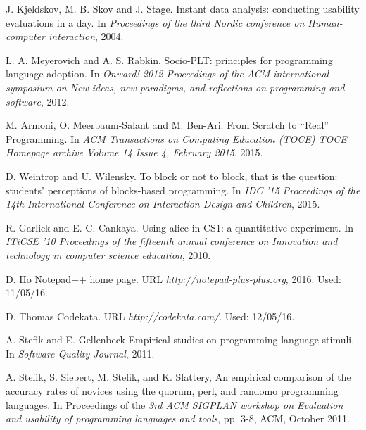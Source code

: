 \documentclass[preprint,10pt]{sigplanconf}
\begin{document}
\begin{thebibliography}{}
J. Kjeldskov, M. B. Skov and J. Stage. \newblock Instant data analysis: conducting usability evaluations in a day. \newblock In \emph{Proceedings of the third Nordic conference on Human-computer interaction}, 2004.

L. A. Meyerovich and A. S. Rabkin. \newblock Socio-PLT: principles for programming language adoption. \newblock In \emph{Onward! 2012 Proceedings of the ACM international symposium on New ideas, new paradigms, and reflections on programming and software}, 2012.

M. Armoni, O. Meerbaum-Salant and M. Ben-Ari. \newblock From Scratch to “Real” Programming. \newblock In \emph{ACM Transactions on Computing Education (TOCE) TOCE Homepage archive Volume 14 Issue 4, February 2015}, 2015.

D. Weintrop and U. Wilensky. \newblock To block or not to block, that is the question: students' perceptions of blocks-based programming. \newblock In \emph{IDC '15 Proceedings of the 14th International Conference on Interaction Design and Children}, 2015.

R. Garlick and E. C. Cankaya. \newblock Using alice in CS1: a quantitative experiment. \newblock In \emph{ITiCSE '10 Proceedings of the fifteenth annual conference on Innovation and technology in computer science education}, 2010.

D. Ho \newblock Notepad++ home page. \newblock URL \emph{http://notepad-plus-plus.org}, 2016. \newblock Used: 11/05/16.

D. Thomas \newblock Codekata. \newblock URL \emph{http://codekata.com/}. \newblock Used: 12/05/16.

A. Stefik and E. Gellenbeck \newblock Empirical studies on programming language stimuli. \newblock In \emph{Software Quality Journal}, 2011.

A. Stefik, S. Siebert, M. Stefik, and K. Slattery, \newblock An empirical comparison of the accuracy rates of novices using the quorum, perl, and randomo programming languages. \newblock In Proceedings of the \emph{3rd ACM SIGPLAN workshop on Evaluation and usability of programming languages and tools}, pp. 3-8, ACM, October 2011.


\end{thebibliography}
\end{document}
